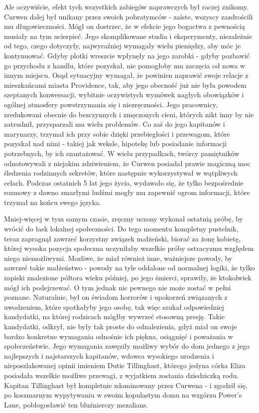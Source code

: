 Ale oczywiście, efekt tych wszystkich zabiegów naprawczych był raczej znikomy. Curwen dalej był unikany przez swoich pobratymców - zaiste, wszyscy zazdrościli mu długowieczności. Mógł on dostrzec, że w efekcie jego bogactwa z pewnością musiały na tym ucierpieć. Jego skomplikowane studia i eksperymenty, niezależnie od tego, czego dotyczyły, najwyraźniej wymagały wielu pieniędzy, aby móc je kontynuować. Gdyby plotki wreszcie wpłynęły na jego zarobki - gdyby pozbawić go przychodu z handlu, które pozyskał, nie pomogłoby mu zaczęcia od nowa w innym miejscu. Osąd sytuacyjny wymagał, że powinien naprawić swoje relacje z mieszkańcami miasta Providence, tak, aby jego obecność już nie była powodem szeptanych konwersacji, wybitnie oczywistych wymówek nagłych obowiązków i ogólnej atmosfery powstrzymania się i niezręczności. Jego pracownicy, zredukowani obecnie do bezczynnych i zmęczonych cieni, których nikt inny by nie zatrudnił, przysparzali mu wielu problemów. Co zaś do jego kapitanów i marynarzy, trzymał ich przy sobie dzięki przebiegłości i przewagom, które pozyskał nad nimi - takiej jak weksle, hipotekę lub posiadanie informacji potrzebnych, by ich szantażować. W wielu przypadkach, twórcy pamiętników odnotowywali z niejakim zdziwieniem, że Curwen posiadał prawie magiczną moc śledzenia rodzinnych sekretów, które następnie wykorzystywał w wątpliwych celach. Podczas ostatnich 5 lat jego życia, wydawało się, że tylko bezpośrednie rozmowy z dawno zmarłymi ludźmi mogły mu zapewnić ogrom informacji, które trzymał na końcu swego języka. 

Mniej-więcej w tym samym czasie, zręczny uczony wykonał ostatnią próbę, by wrócić do łask lokalnej społeczności. Do tego momentu kompletny pustelnik, teraz zapragnął zawrzeć korzystny związek małżeński, biorać za żonę kobietę, której wysoka pozycja społeczna uczyniłaby wszelkie próby ostracyzmu względem niego niemożliwymi. Mozliwe, że miał również inne, ważniejsze powody, by zawrzeć takie małżeństwo - powody na tyle oddalone od normalnej logiki, że tylko zapiski znalezione półtora wieku później, po jego śmierci, sprawiły, że ktokolwiek mógł ich podejrzewać. O tym jednak nic pewnego nie może zostać w pełni poznane. Naturalnie, był on świadom horrorów i upokorzeń związanych z uwodzeniem, które spotkałyby jego osobę, tak więc szukał odpowiedniej kandydatki, na której rodzicach mógłby wywrzeć stosowną presję. Takie kandydatki, odkrył, nie były tak proste do odnalezienia, gdyż miał on swoje bardzo konkretne wymagania odnośnie ich piękna, osiągnięć i poważania w społeczeństwie. Jego wymagania zawęziły możliwy wybór do dom jednego z jego najlepszych i najstarszych kapitanów, wdowca wysokiego urodzenia i nieposzlakowanej opinii imieniem Dutie Tillinghast, którego jedyna córka Eliza posiadała wszelkie możliwe przewagi, z wyjatkiem zostania dziedziczką rodu. Kapitan Tillinghast był kompletnie zdominowany przez Curwena - i zgodził się, po koszmarnym wypytywaniu w swoim kopulastym domu na wzgórzu Power's Lane, pobłogosławić ten bluźnierczy mezalians. 

